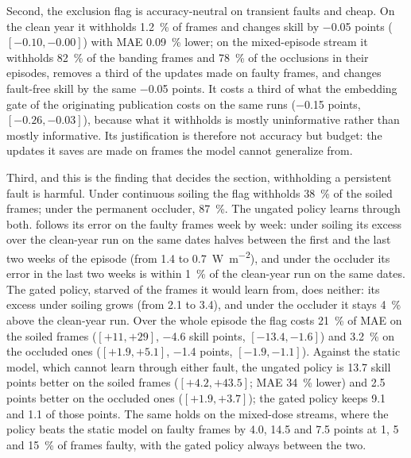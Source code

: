 Second, the exclusion flag is accuracy-neutral on transient faults and cheap. On the clean year it withholds \SI{1.2}{\percent} of frames and changes skill by \num{-0.05} points ($[-0.10, -0.00]$) with MAE \SI{0.09}{\percent} lower; on the mixed-episode stream it withholds \SI{82}{\percent} of the banding frames and \SI{78}{\percent} of the occlusions in their episodes, removes a third of the updates made on faulty frames, and changes fault-free skill by the same \num{-0.05} points. It costs a third of what the embedding gate of the originating publication costs on the same runs (\num{-0.15} points, $[-0.26, -0.03]$), because what it withholds is mostly uninformative rather than mostly informative. Its justification is therefore not accuracy but budget: the updates it saves are made on frames the model cannot generalize from.

Third, and this is the finding that decides the section, withholding a persistent fault is harmful. Under continuous soiling the flag withholds \SI{38}{\percent} of the soiled frames; under the permanent occluder, \SI{87}{\percent}. The ungated policy learns through both.  follows its error on the faulty frames week by week: under soiling its excess over the clean-year run on the same dates halves between the first and the last two weeks of the episode (from \num{+1.4} to \SI{+0.7}{\watt\per\square\meter}), and under the occluder its error in the last two weeks is within \SI{1}{\percent} of the clean-year run on the same dates. The gated policy, starved of the frames it would learn from, does neither: its excess under soiling grows (from \num{+2.1} to \num{+3.4}), and under the occluder it stays \SI{4}{\percent} above the clean-year run. Over the whole episode the flag costs \SI{21}{\percent} of MAE on the soiled frames ($[+11, +29]$, \num{-4.6} skill points, $[-13.4, -1.6]$) and \SI{3.2}{\percent} on the occluded ones ($[+1.9, +5.1]$, \num{-1.4} points, $[-1.9, -1.1]$). Against the static model, which cannot learn through either fault, the ungated policy is \num{13.7} skill points better on the soiled frames ($[+4.2, +43.5]$; MAE \SI{34}{\percent} lower) and \num{2.5} points better on the occluded ones ($[+1.9, +3.7]$); the gated policy keeps \num{9.1} and \num{1.1} of those points. The same holds on the mixed-dose streams, where the policy beats the static model on faulty frames by \num{4.0}, \num{14.5} and \num{7.5} points at 1, 5 and \SI{15}{\percent} of frames faulty, with the gated policy always between the two.

